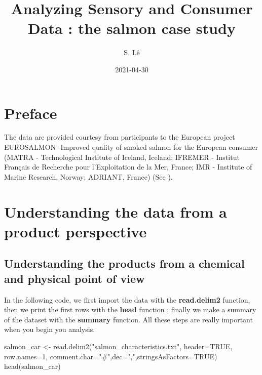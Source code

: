 \documentclass[
]{book}
\title{Analyzing Sensory and Consumer Data : the salmon case study}
\author{S. Lê}
\date{2021-04-30}
\newenvironment{Shaded}{\begin{snugshade}}{\end{snugshade}}
\newcommand{\AttributeTok}[1]{\textcolor[rgb]{0.77,0.63,0.00}{#1}}
\newcommand{\ConstantTok}[1]{\textcolor[rgb]{0.00,0.00,0.00}{#1}}
\newcommand{\DecValTok}[1]{\textcolor[rgb]{0.00,0.00,0.81}{#1}}
\newcommand{\FunctionTok}[1]{\textcolor[rgb]{0.00,0.00,0.00}{#1}}
\newcommand{\NormalTok}[1]{#1}
\newcommand{\OtherTok}[1]{\textcolor[rgb]{0.56,0.35,0.01}{#1}}
\newcommand{\StringTok}[1]{\textcolor[rgb]{0.31,0.60,0.02}{#1}}
\begin{document}
\maketitle

{
\setcounter{tocdepth}{1}
\tableofcontents
}
\hypertarget{preface}{%
\chapter*{Preface}\label{preface}}

The data are provided courtesy from participants to the European project EUROSALMON -Improved quality of smoked salmon for the European consumer (MATRA - Technological Institute of Iceland, Iceland; IFREMER - Institut Français de Recherche pour l'Exploitation de la Mer, France; IMR - Institute of Marine Research, Norway; ADRIANT, France) (See \citet{courcoux06}).

\hypertarget{understanding-the-data-from-a-product-perspective}{%
\chapter{Understanding the data from a product perspective}\label{understanding-the-data-from-a-product-perspective}}

\hypertarget{understanding-the-products-from-a-chemical-and-physical-point-of-view}{%
\section{Understanding the products from a chemical and physical point of view}\label{understanding-the-products-from-a-chemical-and-physical-point-of-view}}

In the following code, we first import the data with the \textbf{read.delim2} function, then we print the first rows with the \textbf{head} function ; finally we make a summary of the dataset with the \textbf{summary} function. All these steps are really important when you begin you analysis.

\begin{Shaded}
\begin{Highlighting}[]
\NormalTok{salmon\_car }\OtherTok{\textless{}{-}} \FunctionTok{read.delim2}\NormalTok{(}\StringTok{"salmon\_characteristics.txt"}\NormalTok{, }
\AttributeTok{header=}\ConstantTok{TRUE}\NormalTok{, }\AttributeTok{row.names=}\DecValTok{1}\NormalTok{, }\AttributeTok{comment.char=}\StringTok{"\#"}\NormalTok{,}\AttributeTok{dec=}\StringTok{","}\NormalTok{,}\AttributeTok{stringsAsFactors=}\ConstantTok{TRUE}\NormalTok{)}
\FunctionTok{head}\NormalTok{(salmon\_car)}
\end{Highlighting}
\end{Shaded}
\end{document}
